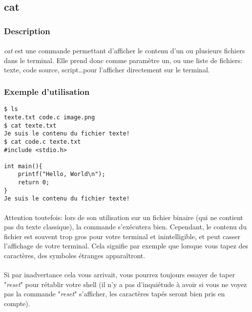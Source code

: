 \subsection{cat}
\subsubsection*{Description}

\paragraph{} \emph{cat} est une commande permettant d'afficher le contenu d'un
ou plusieurs fichiers dans le terminal. Elle prend donc comme paramètre un, ou
une liste de fichiers: texte, code source, script\ldots pour l'afficher
directement sur le terminal.

\subsubsection*{Exemple d'utilisation}

\begin{lstlisting}
$ ls
texte.txt code.c image.png
$ cat texte.txt
Je suis le contenu du fichier texte!
$ cat code.c texte.txt
#include <stdio.h>

int main(){
	printf("Hello, World\n");
	return 0;
}
Je suis le contenu du fichier texte!
\end{lstlisting}

\paragraph{} Attention toutefois: lors de son utilisation sur un fichier
binaire (qui ne contient pas du texte classique), la commande s'exécutera bien.
Cependant, le contenu du fichier est souvent trop gros pour votre terminal et
inintelligible, et peut casser l'affichage de votre terminal. Cela signifie par
exemple que lorsque vous tapez des caractères, des symboles étranges
apparaîtront.

\paragraph{} Si par inadvertance cela vous arrivait, vous pourrez toujours
essayer de taper "\emph{reset}" pour rétablir votre shell (il n'y a pas
d'inquiétude à avoir si vous ne voyez pas la commande "\emph{reset}"
s'afficher, les caractères tapés seront bien pris en compte).
